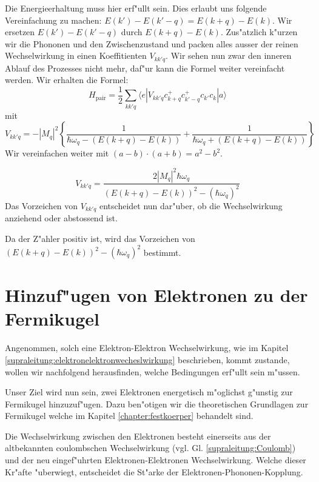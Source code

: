 \begin{refsection}
Die Energieerhaltung muss hier erf"ullt sein. Dies erlaubt uns folgende Vereinfachung zu machen:
$E(k')-E(k'-q) = E(k+q)-E(k)$. Wir ersetzen $E(k')-E(k'-q)$ durch $E(k+q)-E(k)$.
Zus"atzlich k"urzen wir die Phononen und den Zwischenzustand und packen
alles ausser der reinen Wechselwirkung in einen Koeffitienten $V_{kk'q}$.
Wir sehen nun zwar den inneren Ablauf des Prozesses nicht mehr, daf"ur kann die Formel
weiter vereinfacht werden.
Wir erhalten die Formel:
\begin{equation}
H_{\text{pair}}=
\frac{1}{2}
\sum \limits_{kk'q} 
\langle e|V_{kk'q}c^+_{k+q}c^+_{k'-q}c_{k'}c_k|a \rangle
\label{supraleitung:WechelwirkungKurz}
\end{equation}
mit
\begin{equation}
V_{kk'q} = - |M_q|^2 \left\{
\frac{1}{\hbar\omega_q-(E(k+q)-E(k))}
+
\frac{1}{\hbar\omega_q+(E(k+q)-E(k))}
\right\}
\label{supraleitung:WechelwirkungVkk'q}
\end{equation}
Wir vereinfachen weiter mit $(a-b)\cdot (a+b) = a^2-b^2$.

\begin{equation}
V_{kk'q} =
\frac
{2|M_q|^2\hbar\omega_q}
{(E(k+q)-E(k))^2-(\hbar\omega_q)^2}
\label{supraleitung:Wechelwirkung_Vkk'q_Kurz}
\end{equation}
Das Vorzeichen von $V_{kk'q}$ entscheidet nun dar"uber, ob die Wechselwirkung
anziehend oder abstossend ist.

Da der Z"ahler positiv ist, wird das Vorzeichen von $(E(k+q)-E(k))^2-(\hbar\omega_q)^2$ bestimmt.

\section{Hinzuf"ugen von Elektronen zu der Fermikugel}
Angenommen, solch eine Elektron-Elektron Wechselwirkung, wie im Kapitel
\ref{supraleitung:elektronelektronwecheslwirkung} beschrieben, kommt zustande,
wollen wir nachfolgend herausfinden, welche Bedingungen erf"ullt sein m"ussen.

Unser Ziel wird nun sein, zwei Elektronen energetisch m"oglichst g"unstig zur Fermikugel hinzuzuf"ugen.
Dazu ben"otigen wir die theoretischen Grundlagen zur Fermikugel welche im Kapitel
\ref{chapter:festkoerper} behandelt sind.


Die Wechselwirkung zwischen den Elektronen besteht einerseits aus der altbekannten coulombschen
Wechselwirkung (vgl. Gl. \ref{supraleitung:Coulomb}) und der neu eingef"uhrten
Elektronen-Elektronen Wechselwirkung.
Welche dieser Kr"afte "uberwiegt, entscheidet die St"arke der Elektronen-Phononen-Kopplung.


\end{refsection}
